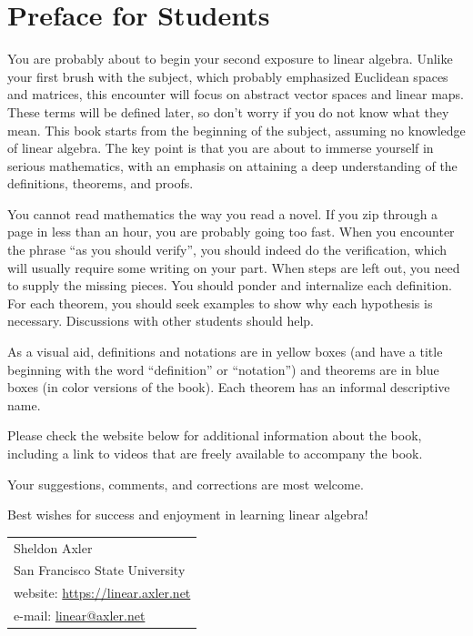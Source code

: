 \chapter*{Preface for Students}

You are probably about to begin your second exposure to linear algebra. Unlike
your first brush with the subject, which probably emphasized Euclidean spaces
and matrices, this encounter will focus on abstract vector spaces and linear
maps. These terms will be defined later, so don't worry if you do not know what
they mean. This book starts from the beginning of the subject, assuming no
knowledge of linear algebra. The key point is that you are about to immerse
yourself in serious mathematics, with an emphasis on attaining a deep
understanding of the definitions, theorems, and proofs.

You cannot read mathematics the way you read a novel. If you zip through a
page in less than an hour, you are probably going too fast. When you encounter
the phrase ``as you should verify'', you should indeed do the verification,
which will usually require some writing on your part. When steps are left out,
you need to supply the missing pieces. You should ponder and internalize each
definition. For each theorem, you should seek examples to show why each
hypothesis is necessary. Discussions with other students should help.

As a visual aid, definitions and notations are in yellow boxes (and have a
title beginning with the word ``\textsf{definition}'' or ``\textsf{notation}'')
and theorems are in blue boxes (in color versions of the book). Each theorem
has an informal descriptive name.

Please check the website below for additional information about the book,
including a link to videos that are freely available to accompany the book.

Your suggestions, comments, and corrections are most welcome.

Best wishes for success and enjoyment in learning linear algebra!

\medskip
\noindent\begin{tabular}{@{}l@{}}
Sheldon Axler\\
San Francisco State University\\[3pt]
website: \url{https://linear.axler.net}\\
e-mail: \href{mailto:linear@axler.net}{linear@axler.net}
\end{tabular}

